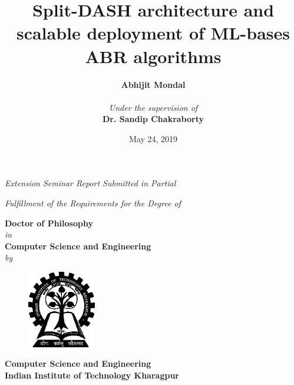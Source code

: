 \title{\bf{Split-DASH architecture and scalable deployment of ML-bases ABR algorithms}}
\date{}
\author{}
\maketitle
\thispagestyle{empty}
\begin{center}
	\vspace*{5mm}
	\textit{Extension Seminar Report Submitted in Partial}
	\par
	\vspace*{4mm}
	\textit{Fulfillment of the Requirements for the Degree of}
	\par
	\vspace*{5mm}
	{\large\textbf{Doctor of Philosophy}\\
		\vspace*{2mm}\textit{in}\\
		\vspace*{2mm}\large\textbf{Computer Science and Engineering}
		\\\vspace*{2mm}\textit{by}\\
		\vspace*{2mm}}
	\author{\large\textbf{Abhijit Mondal}\\
		\vspace*{2mm}{\small{[Roll No - 15CS91R09]}}\\
		\vspace*{15mm}\textit{Under the supervision of}\\
		\vspace*{2mm}\textbf{Dr. Sandip Chakraborty}\\}
	\vspace*{30mm}
	\begin{figure}[!ht]
		\centering
		\includegraphics[width=3cm]{img/iit_logo}
	\end{figure}
	\bf{Computer Science and Engineering
		\\Indian Institute of Technology Kharagpur
	}\\
	\date{May 24, 2019}
\end{center}
\newpage